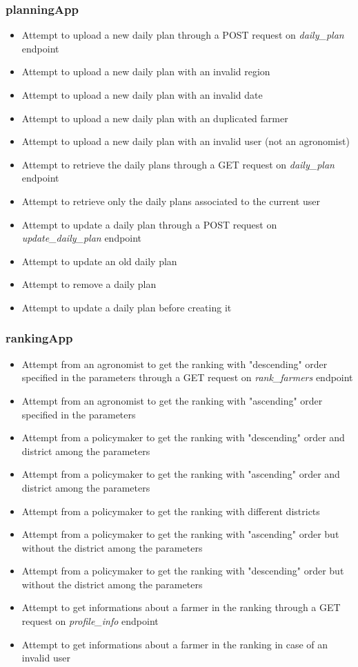 \documentclass[table, 12pt]{article}
\begin{document}
\subsubsection*{planningApp}
\begin{itemize}
    \item Attempt to upload a new daily plan through a POST request on \textit{daily\_plan} endpoint
    \item Attempt to upload a new daily plan with an invalid region
    \item Attempt to upload a new daily plan with an invalid date
    \item Attempt to upload a new daily plan with an duplicated farmer
    \item Attempt to upload a new daily plan with an invalid user (not an agronomist)
    \item Attempt to retrieve the daily plans through a GET request on \textit{daily\_plan} endpoint
    \item Attempt to retrieve only the daily plans associated to the current user
    \item Attempt to update a daily plan through a POST request on \textit{update\_daily\_plan} endpoint
    \item Attempt to update an old daily plan
    \item Attempt to remove a daily plan
    \item Attempt to update a daily plan before creating it
\end{itemize}
\subsubsection*{rankingApp}
\begin{itemize}
    \item Attempt from an agronomist to get the ranking with "descending" order specified in the parameters through a GET request on \textit{rank\_farmers} endpoint
    \item Attempt from an agronomist to get the ranking with "ascending" order specified in the parameters
    \item Attempt from a policymaker to get the ranking with "descending" order and district among the parameters
    \item Attempt from a policymaker to get the ranking with "ascending" order and district among the parameters
    \item Attempt from a policymaker to get the ranking with different districts
    \item Attempt from a policymaker to get the ranking with "ascending" order but without the district among the parameters
    \item Attempt from a policymaker to get the ranking with "descending" order but without the district among the parameters
    \item Attempt to get informations about a farmer in the ranking through a GET request on \textit{profile\_info} endpoint
    \item Attempt to get informations about a farmer in the ranking in case of an invalid user
\end{itemize}
\end{document}
